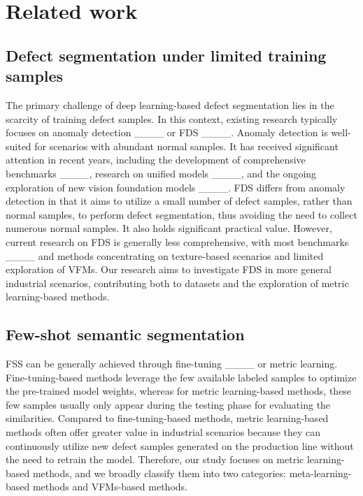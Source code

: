 \section{Related work}
\subsection{Defect segmentation under limited training samples}
The primary challenge of deep learning-based defect segmentation lies in the scarcity of training defect samples. In this context, existing research typically focuses on anomaly detection  ____ or FDS ____. Anomaly detection is well-suited for scenarios with abundant normal samples. It has received significant attention in recent years, including the development of comprehensive benchmarks ____, research on unified models ____, and the ongoing exploration of new vision foundation models ____. FDS differs from anomaly detection in that it aims to utilize a small number of defect samples, rather than normal samples, to perform defect segmentation, thus avoiding the need to collect numerous normal samples. It also holds significant practical value. However, current research on FDS is generally less comprehensive, with most benchmarks ____ and methods concentrating on texture-based scenarios and limited exploration of VFMs. Our research aims to investigate FDS in more general industrial scenarios, contributing both to datasets and the exploration of metric learning-based methods. 



\subsection{Few-shot semantic segmentation}
FSS can be generally achieved through fine-tuning ____ or metric learning. Fine-tuning-based methods leverage the few available labeled samples to optimize the pre-trained model weights, whereas for metric learning-based methods, these few samples usually only appear during the testing phase for evaluating the similarities. Compared to fine-tuning-based methods, metric learning-based methods often offer greater value in industrial scenarios because they can continuously utilize new defect samples generated on the production line without the need to retrain the model. Therefore, our study focuses on metric learning-based methods, and we broadly classify them into two categories: meta-learning-based methods and VFMs-based methods. 



